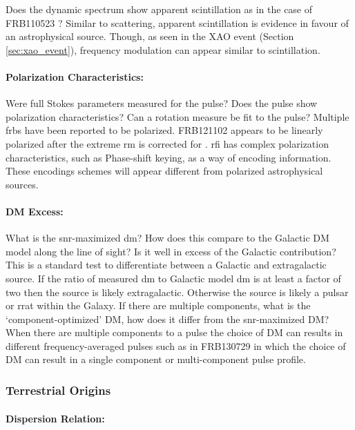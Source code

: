\documentclass[a4paper,fleqn,usenatbib]{mnras}
\begin{document}
Does the dynamic spectrum show apparent scintillation as in the case of
FRB110523 \cite{2015Natur.528..523M}?  Similar to scattering, apparent
scintillation is evidence in favour of an astrophysical source. Though, as seen
in the XAO event (Section \ref{sec:xao_event}), frequency modulation can appear
similar to scintillation.

\paragraph{Polarization Characteristics:}

Were full Stokes parameters measured for the pulse? Does the pulse show
polarization characteristics? Can a rotation measure be fit to the pulse?
Multiple \glspl{frb} have been reported to be polarized.  FRB121102 appears to
be linearly polarized after the extreme \gls{rm} is corrected for
\citep{2018Natur.553..182M}.  \gls{rfi} has complex polarization
characteristics, such as Phase-shift keying, as a way of encoding information.
These encodings schemes will appear different from polarized astrophysical
sources.

\paragraph{DM Excess:}

What is the \gls{snr}-maximized \gls{dm}? How does this compare to the Galactic
DM model along the line of sight? Is it well in excess of the Galactic
contribution? This is a standard test to differentiate between a Galactic and
extragalactic source. If the ratio of measured \gls{dm} to Galactic model
\gls{dm} is at least a factor of two then the source is likely extragalactic.
Otherwise the source is likely a pulsar or \gls{rrat} within the Galaxy.  If
there are multiple components, what is the `component-optimized' DM, how does it
differ from the \gls{snr}-maximized DM? When there are multiple components to a
pulse the choice of DM can results in different frequency-averaged pulses such
as in FRB130729 in which the choice of DM can result in a single component or
multi-component pulse profile. 

\subsubsection{Terrestrial Origins}

\paragraph{Dispersion Relation:}
\end{document}
